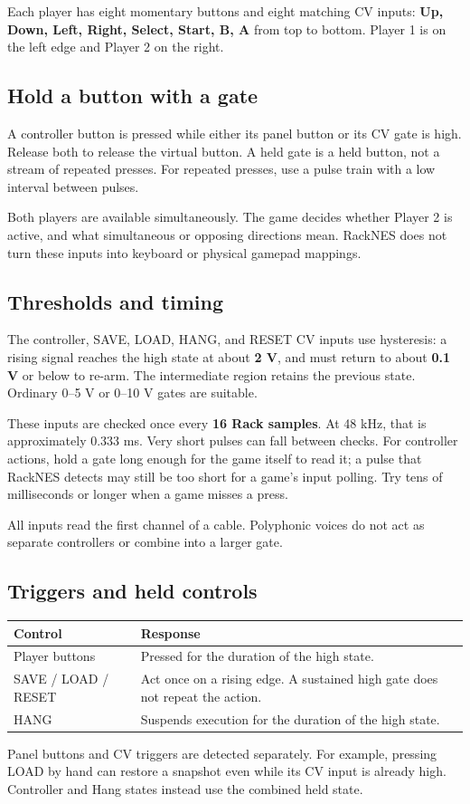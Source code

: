 Each player has eight momentary buttons and eight matching CV inputs:
\textbf{Up, Down, Left, Right, Select, Start, B, A} from top to bottom.
Player 1 is on the left edge and Player 2 on the right.

\subsection{Hold a button with a gate}
A controller button is pressed while either its panel button or its CV gate
is high. Release both to release the virtual button. A held gate is a held
button, not a stream of repeated presses. For repeated presses, use a pulse
train with a low interval between pulses.

Both players are available simultaneously. The game decides whether Player 2
is active, and what simultaneous or opposing directions mean. RackNES does
not turn these inputs into keyboard or physical gamepad mappings.

\subsection{Thresholds and timing}
The controller, SAVE, LOAD, HANG, and RESET CV inputs use hysteresis:
a rising signal reaches the high state at about \textbf{2 V}, and must
return to about \textbf{0.1 V} or below to re-arm. The intermediate region
retains the previous state. Ordinary 0--5 V or 0--10 V gates are suitable.

These inputs are checked once every \textbf{16 Rack samples}. At 48 kHz,
that is approximately 0.333 ms. Very short pulses can fall between checks.
For controller actions, hold a gate long enough for the game itself to read
it; a pulse that RackNES detects may still be too short for a game's input
polling. Try tens of milliseconds or longer when a game misses a press.

All inputs read the first channel of a cable. Polyphonic voices do not act
as separate controllers or combine into a larger gate.

\subsection{Triggers and held controls}
\begin{tabularx}{\textwidth}{@{}p{}X@{}}
\toprule
\textbf{Control} & \textbf{Response} \\
\midrule
Player buttons & Pressed for the duration of the high state. \\
SAVE / LOAD / RESET & Act once on a rising edge. A sustained high gate does not repeat the action. \\
HANG & Suspends execution for the duration of the high state. \\
\bottomrule
\end{tabularx}

Panel buttons and CV triggers are detected separately. For example, pressing
LOAD by hand can restore a snapshot even while its CV input is already
high. Controller and Hang states instead use the combined held state.
